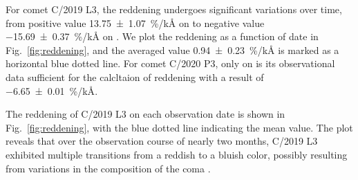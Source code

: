For comet C/2019 L3, the reddening undergoes significant variations over time, from positive value {\qty{13.75 +- 1.07}{\percent/\kilo\angstrom}} on  to negative value {\qty{-15.69 +- 0.37}{\percent/\kilo\angstrom}} on . We plot the reddening as a function of date in Fig.~\ref{fig:reddening}, and the averaged value {\qty{0.94 +- 0.23}{\percent/\kilo\angstrom}} is marked as a horizontal blue dotted line. For comet C/2020 P3, only on  is its observational data sufficient for the calcltaion of reddening with a result of {\qty{-6.65 +- 0.01}{\percent/\kilo\angstrom}}. 

The reddening of C/2019 L3 on each observation date is shown in Fig.~\ref{fig:reddening}, with the blue dotted line indicating the mean value. The plot reveals that over the observation course of nearly two months, C/2019 L3 exhibited multiple transitions from a reddish to a bluish color, possibly resulting from variations in the composition of the coma \citep{ivanova_colour_2017}. 

